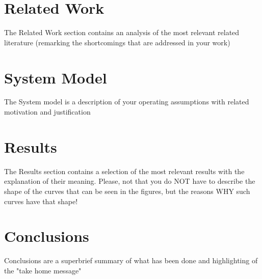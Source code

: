 \documentclass[conference,10pt]{IEEEtran}
\begin{document}
\section{Related Work}\label{sec:sota}
The Related Work section contains an analysis of the most relevant related literature (remarking the shortcomings that are addressed in your work)

\section{System Model}\label{sec:symo}
The System model is a description of your operating assumptions with related motivation and justification

\section{Results}\label{sec:res}
The Results section contains a selection of the most relevant results with the explanation of their meaning. Please, not that you do NOT have to describe the shape of the curves that can be seen in the figures, but the reasons WHY such curves have that shape!

\section{Conclusions}\label{sec:conclusion}
Conclusions are a superbrief summary of what has been done and highlighting of the "take home message"
\end{document}
